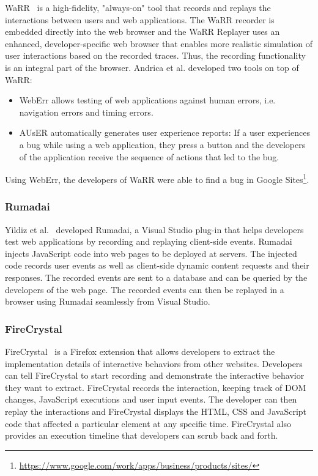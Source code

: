 WaRR~\cite{warr2011} is a high-fidelity, "always-on" tool that records and replays the interactions between users and web applications. The WaRR recorder is embedded directly into the web browser and the WaRR Replayer uses an enhanced, developer-specific web browser that enables more realistic simulation of user interactions based on the recorded traces. Thus, the recording functionality is an integral part of the browser. Andrica et al. developed two tools on top of WaRR:
\begin{itemize}
	\item WebErr allows testing of web applications against human errors, i.e. navigation errors and timing errors.
	\item AUsER automatically generates user experience reports: If a user experiences a bug while using a web application, they press a button and the developers of the application receive the sequence of actions that led to the bug.
\end{itemize}
Using WebErr, the developers of WaRR were able to find a bug in Google Sites\footnote{\url{https://www.google.com/work/apps/business/products/sites/}}.

\subsubsection{Rumadai}

Yildiz et al.~\cite{rumadai2012} developed Rumadai, a Visual Studio plug-in that helps developers test web applications by recording and replaying client-side events. Rumadai injects JavaScript code into web pages to be deployed at servers. The injected code records user events as well as client-side dynamic content requests and their responses. The recorded events are sent to a database and can be queried by the developers of the web page. The recorded events can then be replayed in a browser using Rumadai seamlessly from Visual Studio.

\subsubsection{FireCrystal}

FireCrystal~\cite{firecrystal2009} is a Firefox extension that allows developers to extract the implementation details of interactive behaviors from other websites. Developers can tell FireCrystal to start recording and demonstrate the interactive behavior they want to extract. FireCrystal records the interaction, keeping track of DOM changes, JavaScript executions and user input events. The developer can then replay the interactions and FireCrystal displays the HTML, CSS and JavaScript code that affected a particular element at any specific time. FireCrystal also provides an execution timeline that developers can scrub back and forth.

